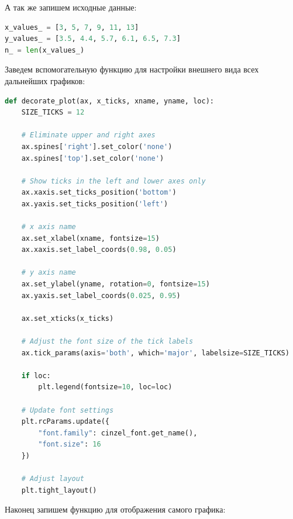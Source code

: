 \documentclass[a4paper, 14pt]{extarticle}
\begin{document}
А так же запишем исходные данные:

\begin{center}
    \begin{lstlisting}[language=Python]
x_values_ = [3, 5, 7, 9, 11, 13]
y_values_ = [3.5, 4.4, 5.7, 6.1, 6.5, 7.3]
n_ = len(x_values_)
    \end{lstlisting}
\end{center}

Заведем вспомогательную функцию для настройки внешнего вида всех дальнейших графиков:

\begin{center}
    \begin{lstlisting}[language=Python]
def decorate_plot(ax, x_ticks, xname, yname, loc):
    SIZE_TICKS = 12

    # Eliminate upper and right axes
    ax.spines['right'].set_color('none')
    ax.spines['top'].set_color('none')

    # Show ticks in the left and lower axes only
    ax.xaxis.set_ticks_position('bottom')
    ax.yaxis.set_ticks_position('left')

    # x axis name
    ax.set_xlabel(xname, fontsize=15)
    ax.xaxis.set_label_coords(0.98, 0.05)

    # y axis name
    ax.set_ylabel(yname, rotation=0, fontsize=15)
    ax.yaxis.set_label_coords(0.025, 0.95)

    ax.set_xticks(x_ticks)

    # Adjust the font size of the tick labels
    ax.tick_params(axis='both', which='major', labelsize=SIZE_TICKS)

    if loc:
        plt.legend(fontsize=10, loc=loc)

    # Update font settings
    plt.rcParams.update({
        "font.family": cinzel_font.get_name(), 
        "font.size": 16
    })

    # Adjust layout
    plt.tight_layout()
    \end{lstlisting}
\end{center}

Наконец запишем функцию для отображения самого графика:
\end{document}
